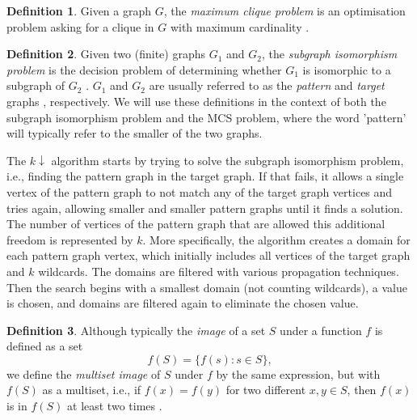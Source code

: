 \documentclass{l4proj}
\theoremstyle{definition}
\newtheorem{definition}{Definition}[chapter]
\theoremstyle{remark}
\begin{document}
\begin{definition}
  Given a graph $G$, the \emph{maximum clique problem} is an optimisation problem
  asking for a clique in $G$ with maximum cardinality
  \cite{DBLP:journals/jgo/PardalosX94a}.
\end{definition}

\begin{definition}
  Given two (finite) graphs $G_1$ and $G_2$, the \emph{subgraph isomorphism
    problem} is the decision problem of determining whether $G_1$ is isomorphic
  to a subgraph of $G_2$ \cite{DBLP:conf/stoc/Cook71}. $G_1$ and $G_2$ are
  usually referred to as the \emph{pattern} and \emph{target} graphs
  \cite{DBLP:journals/ai/Solnon10, Valiente97analgorithm,
    DBLP:journals/constraints/ZampelliDS10}, respectively. We will use these
  definitions in the context of both the subgraph isomorphism problem and the
  MCS problem, where the word 'pattern' will typically refer to the smaller of
  the two graphs.
\end{definition}

\noindent The $k{\downarrow}$ algorithm \cite{DBLP:conf/aaai/HoffmannMR17}
starts by trying to solve the subgraph isomorphism problem, i.e., finding the
pattern graph in the target graph. If that fails, it allows a single vertex of
the pattern graph to not match any of the target graph vertices and tries again,
allowing smaller and smaller pattern graphs until it finds a solution. The
number of vertices of the pattern graph that are allowed this additional freedom
is represented by $k$. More specifically, the algorithm creates a domain for
each pattern graph vertex, which initially includes all vertices of the target
graph and $k$ wildcards. The domains are filtered with various propagation
techniques. Then the search begins with a smallest domain (not counting
wildcards), a value is chosen, and domains are filtered again to eliminate the
chosen value.

\begin{definition}
  Although typically the \emph{image} of a set $S$ under a function $f$
  \cite{algebra} is defined as a set
  \[ f(S) = \{ f(s) : s \in S \}, \]
  we define the \emph{multiset image} of $S$ under $f$ by the same expression,
  but with $f(S)$ as a multiset, i.e., if $f(x) = f(y)$ for two different $x, y
  \in S$, then $f(x)$ is in $f(S)$ at least two times
  \cite{DBLP:books/lib/Knuth98}.
\end{definition}
\end{document}
